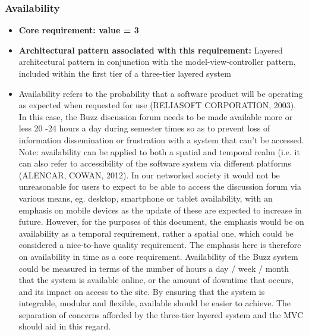 \documentclass[a4paper]{article}
\begin{document}
\subsubsection{Availability}
\begin{itemize}
	\item \textbf{Core requirement: value = 3}
	\item \textbf{Architectural pattern associated with this requirement:} Layered architectural pattern in conjunction with the model-view-controller pattern, included within the first tier of a three-tier layered system
	\item Availability refers to the probability that a software product will be operating as expected when requested for use (RELIASOFT CORPORATION, 2003). In this case, the Buzz discussion forum needs to be made available more or less 20 -24 hours a day during semester times so as to prevent loss of information dissemination or frustration with a system that can’t be accessed. Note: availability can be applied to both a spatial and temporal realm (i.e. it can also refer to accessibility of the software system via different platforms (ALENCAR, COWAN, 2012). In our networked society it would not be unreasonable for users to expect to be able to access the discussion forum via various means, eg. desktop, smartphone or tablet availability, with an emphasis on mobile devices as the update of these are expected to increase in future. However, for the purposes of this document, the emphasis would be on availability as a temporal requirement, rather a spatial one, which could be considered a nice-to-have quality requirement. The emphasis here is therefore on availability in time as a core requirement. Availability of the Buzz system could be measured in terms of the number of hours a day / week / month that the system is available online, or the amount of downtime that occurs, and its impact on access to the site. By ensuring that the system is integrable, modular and flexible, available should be easier to achieve. The separation of concerns  afforded by the three-tier layered system and the MVC should aid in this regard. 
\end{itemize}
\end{document}
